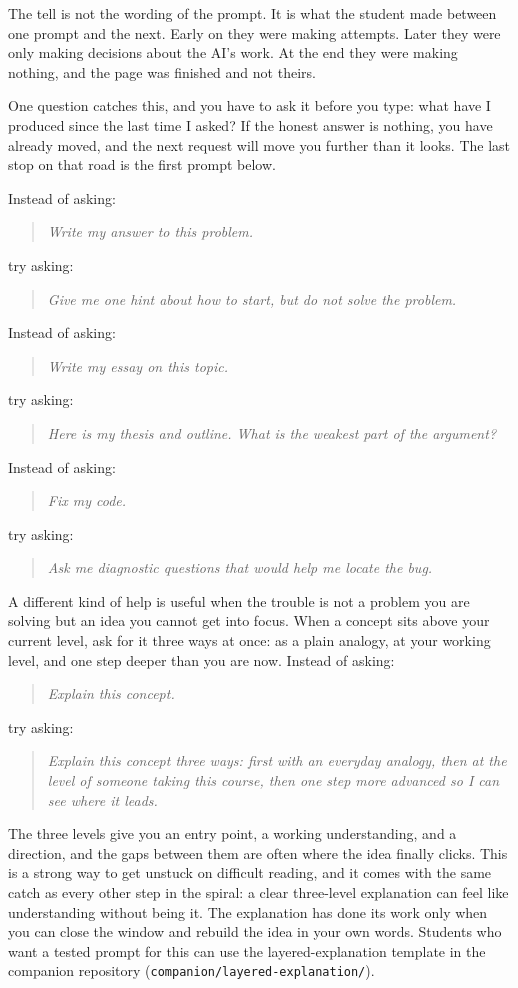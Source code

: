 \documentclass{SIAMbook2023}
\newcommand{\studentprompt}[1]{\begin{quote}\small\itshape #1\end{quote}}
\begin{document}
The tell is not the wording of the prompt. It is what the student made between one prompt and the next. Early on they were making attempts. Later they were only making decisions about the AI's work. At the end they were making nothing, and the page was finished and not theirs.

One question catches this, and you have to ask it before you type: what have I produced since the last time I asked? If the honest answer is nothing, you have already moved, and the next request will move you further than it looks. The last stop on that road is the first prompt below.

Instead of asking:

\studentprompt{Write my answer to this problem.}

try asking:

\studentprompt{Give me one hint about how to start, but do not solve the problem.}

Instead of asking:

\studentprompt{Write my essay on this topic.}

try asking:

\studentprompt{Here is my thesis and outline. What is the weakest part of the argument?}

Instead of asking:

\studentprompt{Fix my code.}

try asking:

\studentprompt{Ask me diagnostic questions that would help me locate the bug.}

A different kind of help is useful when the trouble is not a problem you are solving but an idea you cannot get into focus. When a concept sits above your current level, ask for it three ways at once: as a plain analogy, at your working level, and one step deeper than you are now. Instead of asking:

\studentprompt{Explain this concept.}

try asking:

\studentprompt{Explain this concept three ways: first with an everyday analogy, then at the level of someone taking this course, then one step more advanced so I can see where it leads.}

The three levels give you an entry point, a working understanding, and a direction, and the gaps between them are often where the idea finally clicks. This is a strong way to get unstuck on difficult reading, and it comes with the same catch as every other step in the spiral: a clear three-level explanation can feel like understanding without being it. The explanation has done its work only when you can close the window and rebuild the idea in your own words. Students who want a tested prompt for this can use the layered-explanation template in the companion repository (\texttt{companion/layered-explanation/}).
\end{document}
